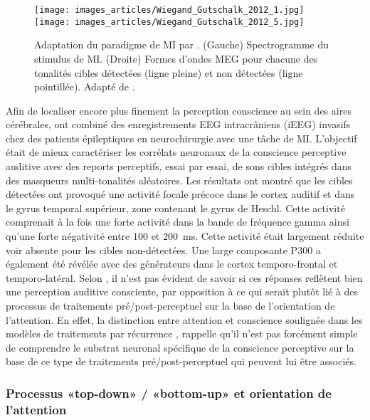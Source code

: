 \begin{figure*}[!t]
\center
\texttt{[image: images\_articles/Wiegand\_Gutschalk\_2012\_1.jpg]}
\texttt{[image: images\_articles/Wiegand\_Gutschalk\_2012\_5.jpg]}
\caption[Formes d'ondes MEG évoquées en réponse à des tonalités détectées sous MI]{Adaptation du paradigme de MI par \cite{wiegand2012correlates}. (Gauche) Spectrogramme du stimulus de MI. (Droite) Formes d'ondes MEG pour chacune des tonalités cibles détectées (ligne pleine) et non détectées (ligne pointillée). Adapté de \cite{wiegand2012correlates}.}
\label{fig:chap2wiegandgutschalk2012}
\end{figure*}

Afin de localiser encore plus finement la perception conscience au sein des aires cérébrales, \cite{dykstra2016neural} ont combiné des enregistrements EEG intracrâniens (iEEG) invasifs chez des patients épileptiques en neurochirurgie avec une tâche de MI. 
L'objectif était de mieux caractériser les corrélats neuronaux de la conscience perceptive auditive avec des reports perceptifs, essai par essai, de sons cibles intégrés dans des masqueurs multi-tonalités aléatoires. 
Les résultats ont montré que les cibles détectées ont provoqué une activité focale précoce dans le cortex auditif et dans le gyrus temporal supérieur, zone contenant le gyrus de Heschl. 
Cette activité comprenait à la fois une forte activité dans la bande de fréquence gamma ainsi qu'une forte négativité entre $100$ et $200$~ms. 
Cette activité était largement réduite voir absente pour les cibles non-détectées. 
Une large composante P300 a également été révélée avec des générateurs dans le cortex temporo-frontal et temporo-latéral. 
Selon \cite{dykstra2016neural}, il n'est pas évident de savoir si ces réponses reflètent bien une perception auditive consciente, par opposition à ce qui serait plutôt lié à des processus de traitements pré/post-perceptuel sur la base de l'orientation de l'attention. 
En effet, la distinction entre attention et conscience soulignée dans les modèles de traitements par récurrence \citep{lamme2000distinct, lamme2003visual, lamme2006towards}, rappelle qu'il n'est pas forcément simple de comprendre le substrat neuronal spécifique de la conscience perceptive sur la base de ce type de traitements pré/post-perceptuel qui peuvent lui être associés. 

\subsubsection{Processus «top-down» / «bottom-up» et orientation de l'attention}


